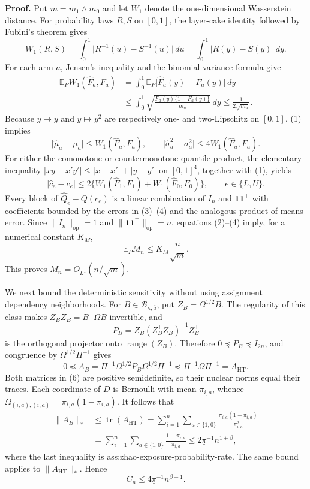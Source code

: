 \textbf{Proof.}
Put \(m=m_1\wedge m_0\) and let \(W_1\) denote the one-dimensional Wasserstein distance.  For probability laws \(R,S\) on \([0,1]\), the layer-cake identity followed by Fubini's theorem gives
\[
W_1(R,S)
=\int_0^1\lvert R^{-1}(u)-S^{-1}(u)\rvert\,du
=\int_0^1\lvert R(y)-S(y)\rvert\,dy.
\tag{1}
\]
For each arm \(a\), Jensen's inequality and the binomial variance formula give
\[
\begin{aligned}
\mathbb E_PW_1(\widehat F_a,F_a)
&=\int_0^1\mathbb E_P\lvert\widehat F_a(y)-F_a(y)\rvert\,dy\\
&\le\int_0^1\sqrt{\frac{F_a(y)\{1-F_a(y)\}}{m_a}}\,dy
\le\frac{1}{2\sqrt{m_a}}.
\end{aligned}
\tag{2}
\]
Because \(y\mapsto y\) and \(y\mapsto y^2\) are respectively one- and two-Lipschitz on \([0,1]\), (1) implies
\[
\lvert\widehat\mu_a-\mu_a\rvert\le W_1(\widehat F_a,F_a),
\qquad
\lvert\widehat\sigma_a^2-\sigma_a^2\rvert
\le4W_1(\widehat F_a,F_a).
\tag{3}
\]
For either the comonotone or countermonotone quantile product, the elementary inequality \(\lvert xy-x'y'\rvert\le\lvert x-x'\rvert+\lvert y-y'\rvert\) on \([0,1]^4\), together with (1), yields
\[
\lvert\widehat c_e-c_e\rvert
\le2\{W_1(\widehat F_1,F_1)+W_1(\widehat F_0,F_0)\},
\qquad e\in\{L,U\}.
\tag{4}
\]
Every block of \(\widehat Q_e-Q(c_e)\) is a linear combination of \(I_n\) and \(\mathbf1\mathbf1^\top\) with coefficients bounded by the errors in (3)--(4) and the analogous product-of-means error.  Since \(\lVert I_n\rVert_{\mathrm{op}}=1\) and \(\lVert\mathbf1\mathbf1^\top\rVert_{\mathrm{op}}=n\), equations (2)--(4) imply, for a numerical constant \(K_M\),
\[
\mathbb E_PM_n
\le K_M\frac{n}{\sqrt m}.
\tag{5}
\]
This proves \(M_n=O_{L^1}(n/\sqrt m)\).

We next bound the deterministic sensitivity without using assignment dependency neighborhoods.  For \(B\in\mathcal B_{\kappa,\overline a}\), put \(Z_B=\Omega^{1/2}B\).  The regularity of this class makes \(Z_B^\top Z_B=B^\top\Omega B\) invertible, and
\[
P_B=Z_B(Z_B^\top Z_B)^{-1}Z_B^\top
\]
is the orthogonal projector onto \(\operatorname{range}(Z_B)\).  Therefore \(0\preceq P_B\preceq I_{2n}\), and congruence by \(\Omega^{1/2}\Pi^{-1}\) gives
\[
0\preceq
A_B=\Pi^{-1}\Omega^{1/2}P_B\Omega^{1/2}\Pi^{-1}
\preceq
\Pi^{-1}\Omega\Pi^{-1}=A_{\mathrm{HT}}.
\tag{6}
\]
Both matrices in (6) are positive semidefinite, so their nuclear norms equal their traces.  Each coordinate of \(D\) is Bernoulli with mean \(\pi_{i,a}\), whence \(\Omega_{(i,a),(i,a)}=\pi_{i,a}(1-\pi_{i,a})\).  It follows that
\[
\begin{aligned}
\lVert A_B\rVert_*
&\le\operatorname{tr}(A_{\mathrm{HT}})
=\sum_{i=1}^n\sum_{a\in\{1,0\}}
\frac{\pi_{i,a}(1-\pi_{i,a})}{\pi_{i,a}^2}\\
&=\sum_{i=1}^n\sum_{a\in\{1,0\}}
\frac{1-\pi_{i,a}}{\pi_{i,a}}
\le2\underline\pi^{-1}n^{1+\beta},
\end{aligned}
\tag{7}
\]
where the last inequality is ass:zhao-exposure-probability-rate.  The same bound applies to \(\lVert A_{\mathrm{HT}}\rVert_*\).  Hence
\[
C_n\le4\underline\pi^{-1}n^{\beta-1}.
\tag{8}
\]

